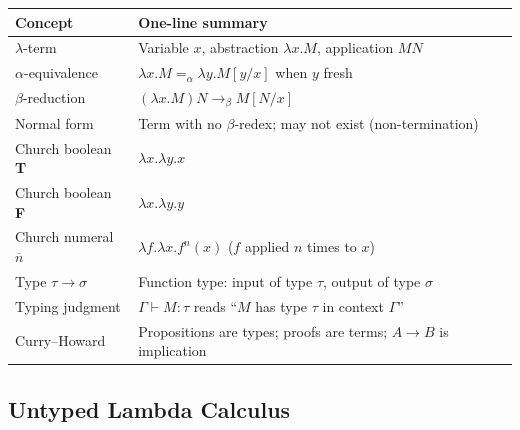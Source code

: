 
\begin{tcolorbox}[colback=gray!6, colframe=gray!40, arc=2pt,
  left=6pt, right=6pt, top=4pt, bottom=4pt,
  title={\small\textbf{Section Toolkit --- Quick Reference}},
  fonttitle=\small\bfseries]
\small
\begin{tabular}{l l}
\toprule
\textbf{Concept} & \textbf{One-line summary} \\
\midrule
$\lambda$-term
  & Variable $x$, abstraction $\lambda x.M$, application $MN$ \\
$\alpha$-equivalence
  & $\lambda x.M =_\alpha \lambda y.M[y/x]$ when $y$ fresh \\
$\beta$-reduction
  & $(\lambda x.M)N \to_\beta M[N/x]$ \\
Normal form
  & Term with no $\beta$-redex; may not exist (non-termination) \\
Church boolean \textbf{T}
  & $\lambda x.\lambda y.x$ \\
Church boolean \textbf{F}
  & $\lambda x.\lambda y.y$ \\
Church numeral $\overline{n}$
  & $\lambda f.\lambda x.f^n(x)$ ($f$ applied $n$ times to $x$) \\
Type $\tau \to \sigma$
  & Function type: input of type $\tau$, output of type $\sigma$ \\
Typing judgment
  & $\Gamma\vdash M : \tau$ reads ``$M$ has type $\tau$ in context $\Gamma$'' \\
Curry--Howard
  & Propositions are types; proofs are terms; $A\to B$ is implication \\
\bottomrule
\end{tabular}
\end{tcolorbox}


\subsection*{Untyped Lambda Calculus}

